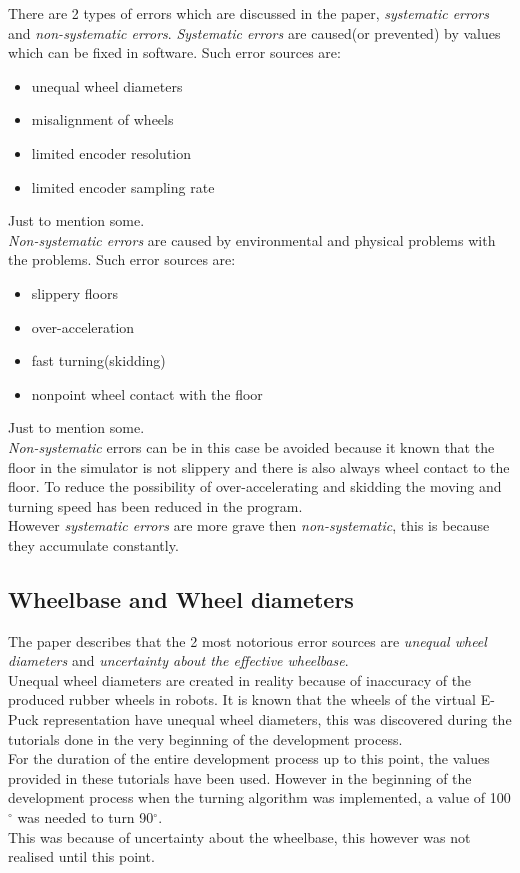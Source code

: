 There are 2 types of errors which are discussed in the paper, \textit{systematic errors} and \textit{non-systematic errors}. \textit{Systematic errors} are caused(or prevented) by values which can be fixed in software. Such error sources are: \\
\begin{itemize}
\item unequal wheel diameters
\item misalignment of wheels
\item limited encoder resolution
\item limited encoder sampling rate
\end{itemize}
Just to mention some. \\
\textit{Non-systematic errors} are caused by environmental and physical problems with the problems.
Such error sources are:\\
\begin{itemize}
\item slippery floors
\item over-acceleration
\item fast turning(skidding)
\item nonpoint wheel contact with the floor
\end{itemize}
Just to mention some.\\
\textit{Non-systematic} errors can be in this case be avoided because it known that the floor in the simulator is not slippery and there is also always wheel contact to the floor. To reduce the possibility of over-accelerating and skidding the moving and turning speed has been reduced in the program.\\
However \textit{systematic errors} are more grave then \textit{non-systematic}, this is because they accumulate constantly.\\[3ex]

\subsection{Wheelbase and Wheel diameters}
The paper describes that the 2 most notorious  error sources are \textit{unequal wheel diameters} and \textit{uncertainty about the effective wheelbase}.\\
Unequal wheel diameters are created in reality because of inaccuracy of the produced rubber wheels in robots. It is known that the wheels of the virtual E-Puck representation have unequal wheel diameters, this was discovered during the tutorials done in the very beginning of the development process.\\
For the duration of the entire development process up to this point, the values provided in these tutorials have been used. However in the beginning of the development process when the turning algorithm was implemented, a value of 100$^{\circ}$ was needed to turn 90$^{\circ}$.\\
This was because of uncertainty about the wheelbase, this however was not realised until this point.\\[3ex]

